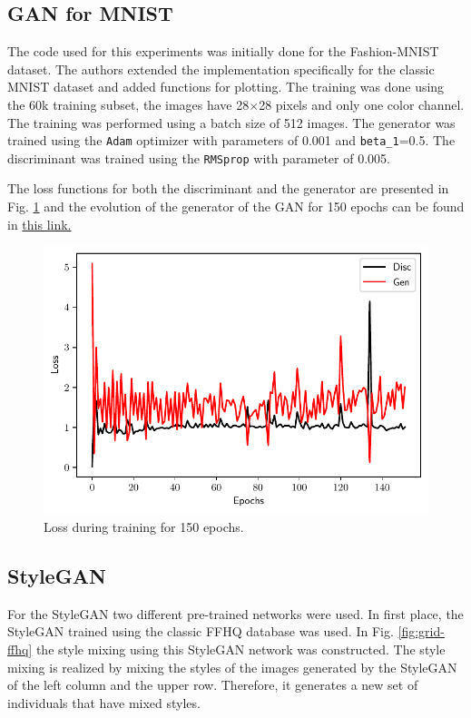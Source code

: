 \documentclass[conference]{IEEEtran}
\theoremstyle{definition}
\theoremstyle{remark}
\theoremstyle{remark}
\begin{document}
\subsection{GAN for MNIST}
The code used for this experiments was initially done for the Fashion-MNIST
dataset. The authors extended the implementation specifically for the classic
MNIST dataset and added functions for plotting. The training was done using the
60k training subset, the images have 28$\times$28 pixels and only one color
channel. The training was performed using a batch size of 512 images. The
generator was trained using the \texttt{Adam} optimizer with parameters of 0.001
and \texttt{beta\_1}=0.5. The discriminant was trained using the
\texttt{RMSprop} with parameter of 0.005.

The loss functions for both the discriminant and the generator are presented in
Fig. \ref{fig:loss-gan} and the evolution of the generator of the GAN for 150
epochs can be found in \href{https://bit.ly/39QXrvO}{this link.}

\begin{figure}
  \centering \includegraphics[width=\columnwidth]{figs/loss-GAN.pdf}
  \caption{Loss during training for 150 epochs.}
  \label{fig:loss-gan}
\end{figure}

\subsection{StyleGAN}

For the StyleGAN two different pre-trained networks were used. In first place,
the StyleGAN trained using the classic FFHQ database was used. In Fig.
\ref{fig:grid-ffhq} the style mixing using this StyleGAN network was
constructed. The style mixing is realized by mixing the styles of the images
generated by the StyleGAN of the left column and the upper row. Therefore, it
generates a new set of individuals that have mixed styles.
\end{document}
